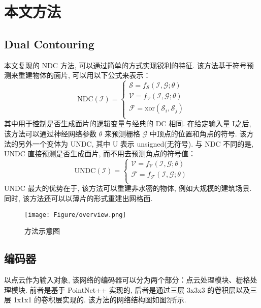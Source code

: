 \section{本文方法}

\subsection{Dual Contouring}
本文复现的 NDC 方法, 可以通过简单的方式实现锐利的特征. 该方法基于符号预测来重建物体的面片, 可以用以下公式来表示：
\begin{equation}
\mathrm{NDC}(\mathcal{I}) =
\begin{cases}
\mathcal{S} = f_{\mathcal{S}}(\mathcal{I,G};\theta) \\
\mathcal{V} = f_{\mathcal{V}}(\mathcal{I,G};\theta) \\
\mathcal{F} = \mathrm{xor}(\mathcal{S}_i, \mathcal{S}_j) \\
\end{cases}
\end{equation}
其中用于控制是否生成面片的逻辑变量与经典的 DC 相同. 在给定输入量 I之后, 该方法可以通过神经网络参数 $\theta$ 来预测栅格 $\mathcal{G}$ 中顶点的位置和角点的符号. 
该方法的另外一个变体为 UNDC, 其中 U 表示 unsigned(无符号). 与 NDC 不同的是, UNDC 直接预测是否生成面片, 而不用去预测角点的符号值：
\begin{equation}
\mathrm{UNDC}(\mathcal{I}) =
\begin{cases}
\mathcal{V} = f_{\mathcal{V}}(\mathcal{I,G};\theta) \\
\mathcal{F} = f_{\mathcal{F}}(\mathcal{I,G};\theta) \\
\end{cases}
\end{equation}
UNDC 最大的优势在于, 该方法可以重建非水密的物体, 例如大规模的建筑场景. 同时, 该方法还可以以薄片的形式重建出网格面. 

\begin{figure}[H]
	\center
	\texttt{[image: Figure/overview.png]}
	\centering
	\caption{方法示意图}\label{fig:fig1}
\end{figure}

\subsection{编码器}
以点云作为输入对象, 该网络的编码器可以分为两个部分：点云处理模块、栅格处理模块. 前者是基于 PointNet++ 实现的, 后者是通过三层 3x3x3 的卷积层以及三层 1x1x1 的卷积层实现的. 该方法的网络结构图如图2所示. 

